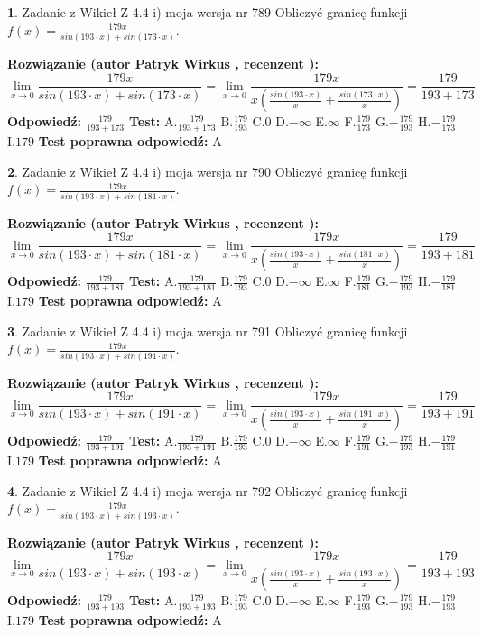 \documentclass[12pt, a4paper]{article}
\theoremstyle{definition} %
\newtheorem{zad}{}
\newcommand{\zadStart}[1]{\begin{zad}#1\newline}
\newcommand{\zadStop}{\end{zad}}
\newcommand{\rozwStart}[2]{\noindent \textbf{Rozwiązanie (autor #1 , recenzent #2): }\newline}
\newcommand{\rozwStop}{\newline}
\newcommand{\odpStart}{\noindent \textbf{Odpowiedź:}\newline}
\newcommand{\odpStop}{\newline}
\newcommand{\testStart}{\noindent \textbf{Test:}\newline}
\newcommand{\testStop}{\newline}
\newcommand{\kluczStart}{\noindent \textbf{Test poprawna odpowiedź:}\newline}
\newcommand{\kluczStop}{\newline}
\begin{document}
\zadStart{Zadanie z Wikieł Z 4.4 i) moja wersja nr 789}
Obliczyć granicę funkcji $f(x)=\frac{179x}{sin(193\cdot x) +sin(173\cdot x)}$.
\zadStop
\rozwStart{Patryk Wirkus}{}
$$\lim\limits_{x\to 0}\frac{179x}{sin(193\cdot x) +sin(173\cdot x)}=\lim\limits_{x\to 0}\frac{179x}{x(\frac{sin(193\cdot x)}{x}+\frac{sin(173\cdot x)}{x})}=\frac{179}{193+173}$$
\rozwStop
\odpStart
$\frac{179}{193+173}$
\odpStop
\testStart
A.$\frac{179}{193+173}$
B.$\frac{179}{193}$
C.$0$
D.$-\infty$
E.$\infty$
F.$\frac{179}{173}$
G.$-\frac{179}{193}$
H.$-\frac{179}{173}$
I.$179$
\testStop
\kluczStart
A
\kluczStop



\zadStart{Zadanie z Wikieł Z 4.4 i) moja wersja nr 790}
Obliczyć granicę funkcji $f(x)=\frac{179x}{sin(193\cdot x) +sin(181\cdot x)}$.
\zadStop
\rozwStart{Patryk Wirkus}{}
$$\lim\limits_{x\to 0}\frac{179x}{sin(193\cdot x) +sin(181\cdot x)}=\lim\limits_{x\to 0}\frac{179x}{x(\frac{sin(193\cdot x)}{x}+\frac{sin(181\cdot x)}{x})}=\frac{179}{193+181}$$
\rozwStop
\odpStart
$\frac{179}{193+181}$
\odpStop
\testStart
A.$\frac{179}{193+181}$
B.$\frac{179}{193}$
C.$0$
D.$-\infty$
E.$\infty$
F.$\frac{179}{181}$
G.$-\frac{179}{193}$
H.$-\frac{179}{181}$
I.$179$
\testStop
\kluczStart
A
\kluczStop



\zadStart{Zadanie z Wikieł Z 4.4 i) moja wersja nr 791}
Obliczyć granicę funkcji $f(x)=\frac{179x}{sin(193\cdot x) +sin(191\cdot x)}$.
\zadStop
\rozwStart{Patryk Wirkus}{}
$$\lim\limits_{x\to 0}\frac{179x}{sin(193\cdot x) +sin(191\cdot x)}=\lim\limits_{x\to 0}\frac{179x}{x(\frac{sin(193\cdot x)}{x}+\frac{sin(191\cdot x)}{x})}=\frac{179}{193+191}$$
\rozwStop
\odpStart
$\frac{179}{193+191}$
\odpStop
\testStart
A.$\frac{179}{193+191}$
B.$\frac{179}{193}$
C.$0$
D.$-\infty$
E.$\infty$
F.$\frac{179}{191}$
G.$-\frac{179}{193}$
H.$-\frac{179}{191}$
I.$179$
\testStop
\kluczStart
A
\kluczStop



\zadStart{Zadanie z Wikieł Z 4.4 i) moja wersja nr 792}
Obliczyć granicę funkcji $f(x)=\frac{179x}{sin(193\cdot x) +sin(193\cdot x)}$.
\zadStop
\rozwStart{Patryk Wirkus}{}
$$\lim\limits_{x\to 0}\frac{179x}{sin(193\cdot x) +sin(193\cdot x)}=\lim\limits_{x\to 0}\frac{179x}{x(\frac{sin(193\cdot x)}{x}+\frac{sin(193\cdot x)}{x})}=\frac{179}{193+193}$$
\rozwStop
\odpStart
$\frac{179}{193+193}$
\odpStop
\testStart
A.$\frac{179}{193+193}$
B.$\frac{179}{193}$
C.$0$
D.$-\infty$
E.$\infty$
F.$\frac{179}{193}$
G.$-\frac{179}{193}$
H.$-\frac{179}{193}$
I.$179$
\testStop
\kluczStart
A
\kluczStop
\end{document}

